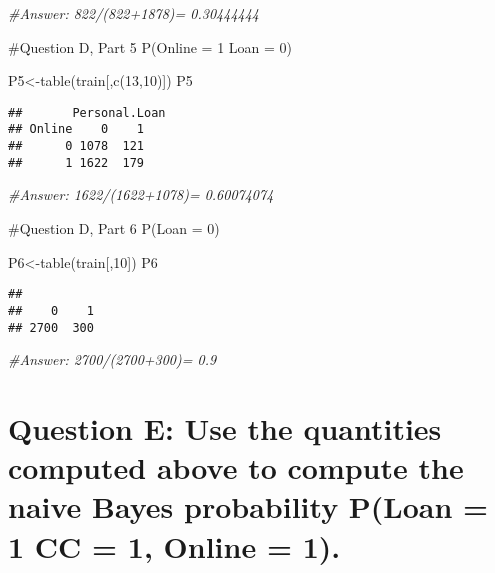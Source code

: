 \documentclass[
]{article}
\newenvironment{Shaded}{\begin{snugshade}}{\end{snugshade}}
\newcommand{\CommentTok}[1]{\textcolor[rgb]{0.56,0.35,0.01}{\textit{#1}}}
\newcommand{\DecValTok}[1]{\textcolor[rgb]{0.00,0.00,0.81}{#1}}
\newcommand{\FunctionTok}[1]{\textcolor[rgb]{0.00,0.00,0.00}{#1}}
\newcommand{\NormalTok}[1]{#1}
\newcommand{\OtherTok}[1]{\textcolor[rgb]{0.56,0.35,0.01}{#1}}
\begin{document}
\begin{Shaded}
\begin{Highlighting}[]
\CommentTok{\#Answer: 822/(822+1878)= 0.30444444}
\end{Highlighting}
\end{Shaded}

\#Question D, Part 5 P(Online = 1 \textbar{} Loan = 0)

\begin{Shaded}
\begin{Highlighting}[]
\NormalTok{P5}\OtherTok{\textless{}{-}}\FunctionTok{table}\NormalTok{(train[,}\FunctionTok{c}\NormalTok{(}\DecValTok{13}\NormalTok{,}\DecValTok{10}\NormalTok{)])}
\NormalTok{P5}
\end{Highlighting}
\end{Shaded}

\begin{verbatim}
##       Personal.Loan
## Online    0    1
##      0 1078  121
##      1 1622  179
\end{verbatim}

\begin{Shaded}
\begin{Highlighting}[]
\CommentTok{\#Answer: 1622/(1622+1078)= 0.60074074}
\end{Highlighting}
\end{Shaded}

\#Question D, Part 6 P(Loan = 0)

\begin{Shaded}
\begin{Highlighting}[]
\NormalTok{P6}\OtherTok{\textless{}{-}}\FunctionTok{table}\NormalTok{(train[,}\DecValTok{10}\NormalTok{])}
\NormalTok{P6}
\end{Highlighting}
\end{Shaded}

\begin{verbatim}
## 
##    0    1 
## 2700  300
\end{verbatim}

\begin{Shaded}
\begin{Highlighting}[]
\CommentTok{\#Answer: 2700/(2700+300)= 0.9}
\end{Highlighting}
\end{Shaded}

\hypertarget{question-e-use-the-quantities-computed-above-to-compute-the-naive-bayes-probability-ploan-1-cc-1-online-1.}{%
\section{Question E: Use the quantities computed above to compute the
naive Bayes probability P(Loan = 1 \textbar{} CC = 1, Online =
1).}\label{question-e-use-the-quantities-computed-above-to-compute-the-naive-bayes-probability-ploan-1-cc-1-online-1.}}
\end{document}
